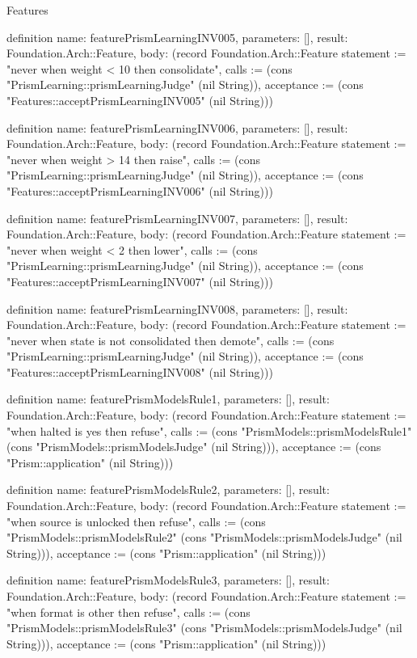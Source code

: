 \begin{lexlean}{Features}
\begin{semanticmodule}
definition{
  name: featurePrismLearningINV005,
  parameters: [],
  result: Foundation.Arch::Feature,
  body: (record Foundation.Arch::Feature {statement := "never when weight < 10 then consolidate", calls := (cons "PrismLearning::prismLearningJudge" (nil String)), acceptance := (cons "Features::acceptPrismLearningINV005" (nil String))})
}

definition{
  name: featurePrismLearningINV006,
  parameters: [],
  result: Foundation.Arch::Feature,
  body: (record Foundation.Arch::Feature {statement := "never when weight > 14 then raise", calls := (cons "PrismLearning::prismLearningJudge" (nil String)), acceptance := (cons "Features::acceptPrismLearningINV006" (nil String))})
}

definition{
  name: featurePrismLearningINV007,
  parameters: [],
  result: Foundation.Arch::Feature,
  body: (record Foundation.Arch::Feature {statement := "never when weight < 2 then lower", calls := (cons "PrismLearning::prismLearningJudge" (nil String)), acceptance := (cons "Features::acceptPrismLearningINV007" (nil String))})
}

definition{
  name: featurePrismLearningINV008,
  parameters: [],
  result: Foundation.Arch::Feature,
  body: (record Foundation.Arch::Feature {statement := "never when state is not consolidated then demote", calls := (cons "PrismLearning::prismLearningJudge" (nil String)), acceptance := (cons "Features::acceptPrismLearningINV008" (nil String))})
}

definition{
  name: featurePrismModelsRule1,
  parameters: [],
  result: Foundation.Arch::Feature,
  body: (record Foundation.Arch::Feature {statement := "when halted is yes then refuse", calls := (cons "PrismModels::prismModelsRule1" (cons "PrismModels::prismModelsJudge" (nil String))), acceptance := (cons "Prism::application" (nil String))})
}

definition{
  name: featurePrismModelsRule2,
  parameters: [],
  result: Foundation.Arch::Feature,
  body: (record Foundation.Arch::Feature {statement := "when source is unlocked then refuse", calls := (cons "PrismModels::prismModelsRule2" (cons "PrismModels::prismModelsJudge" (nil String))), acceptance := (cons "Prism::application" (nil String))})
}

definition{
  name: featurePrismModelsRule3,
  parameters: [],
  result: Foundation.Arch::Feature,
  body: (record Foundation.Arch::Feature {statement := "when format is other then refuse", calls := (cons "PrismModels::prismModelsRule3" (cons "PrismModels::prismModelsJudge" (nil String))), acceptance := (cons "Prism::application" (nil String))})
}


\end{semanticmodule}
\end{lexlean}
